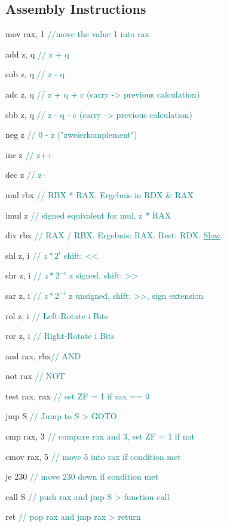 \begin{multicols*}{4}
\subsection{Assembly Instructions}
\begin{description}
    \item mov rax, 1 \textcolor{teal}{//move the value 1 into rax}
    \item add z,   q  \textcolor{teal}{// z + q}
    \item sub z,   q  \textcolor{teal}{// z - q}
    \item adc z,   q  \textcolor{teal}{// z + q + c (carry -> previous calculation)}
    \item sbb z,   q  \textcolor{teal}{// z - q - c (carry -> previous calculation)}
    \item neg z       \textcolor{teal}{// 0 - z ("zweierkomplement")}
    \item inc z       \textcolor{teal}{// z++ }
    \item dec z       \textcolor{teal}{// z-- }
    \item mul rbx     \textcolor{teal}{// RBX * RAX. Ergebnis in RDX \& RAX }
    \item imul z      \textcolor{teal}{// signed equivalent for mul, z * RAX }
    \item div rbx      \textcolor{teal}{// RAX / RBX. Ergebnis: RAX. Rest: RDX. \underline{Slow}.}
    \item shl z,   i  \textcolor{teal}{// \(z * 2^i\) shift: <<}
    \item shr z,   i  \textcolor{teal}{// \(z * 2^{-i}\) z signed, shift: >>}
    \item sar z,   i  \textcolor{teal}{// \(z * 2^{-i}\) z unsigned, shift: >>, sign extension}
    \item rol z,   i  \textcolor{teal}{// Left-Rotate i Bits }
    \item ror z,   i  \textcolor{teal}{// Right-Rotate i Bits }
    \item and rax, rbx\textcolor{teal}{// AND}
    \item not rax     \textcolor{teal}{// NOT}
    \item test rax, rax \textcolor{teal}{// set ZF = 1 if rax == 0}
    \item jmp S       \textcolor{teal}{// Jump to S > GOTO}
    \item cmp rax, 3 \textcolor{teal}{// compare rax and 3, set ZF = 1 if not}
    \item cmov rax, 5 \textcolor{teal}{// move 5 into rax if condition met}
    \item je 230 \textcolor{teal}{// move 230 down if condition met}
    \item call S \textcolor{teal}{// push rax and jmp S > function call}
    \item ret    \textcolor{teal}{// pop rax and jmp rax > return}
\end{description}


\end{multicols*}
